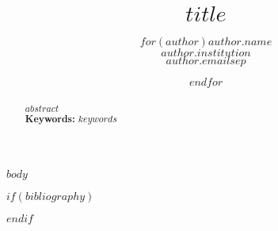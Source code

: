 \documentclass[notitlepage,12pt]{jedm}
\begin{document}
\title{$title$}
\date{} %

\author{$for(author)${\large $author.name$}\\$author.institution$\\$author.email$$sep$ \and $endfor$}

\maketitle

\begin{abstract}
$abstract$\\ %

{\parindent0pt
\textbf{Keywords:} $keywords$
}
\end{abstract}

$body$

$if(bibliography)$


$endif$
\end{document}
